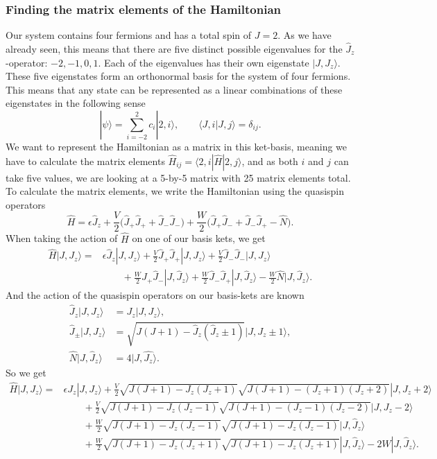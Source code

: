 \documentclass[a4paper, 11pt, notitlepage, english]{article}
\newcommand{\ket}[1]{|#1 \rangle}
\newcommand{\braket}[2]{\langle #1 | #2 \rangle}
\newcommand{\op}[1]{\hat{#1}}
\newcommand{\braopket}[3]{\langle #1 | {#2} | #3 \rangle}
\newcommand{\eps}{\epsilon}
\begin{document}
\subsubsection*{Finding the matrix elements of the Hamiltonian}
Our system contains four fermions and has a total spin of $J=2$. As we have already seen, this means that there are five distinct possible eigenvalues for the $\op{J}_z$-operator: $-2,-1,0,1$. Each of the eigenvalues has their own eigenstate $\ket{J, J_z}$. These five eigenstates form an orthonormal basis for the system of four fermions. This means that any state can be represented as a linear combinations of these eigenstates in the following sense
$$\ket{\psi} = \sum_{i=-2}^2 c_i\ket{2, i}, \qquad \braket{J, i}{J, j} = \delta_{ij}.$$
We want to represent the Hamiltonian as a matrix in this ket-basis, meaning we have to calculate the matrix elements $\op{H}_{ij} = \braopket{2, i}{\op{H}}{2, j}$, and as both $i$ and $j$ can take five values, we are looking at a 5-by-5 matrix with 25 matrix elements total. To calculate the matrix elements, we write the Hamiltonian using the quasispin operators
$$\op{H} = \eps\op{J}_z + \frac{V}{2}\big(\op{J}_+\op{J}_+ + \op{J}_-\op{J}_-\big) + \frac{W}{2}\big(\op{J}_+\op{J}_- + \op{J}_-\op{J}_+ - \op{N}\big).$$
When taking the action of $\op{H}$ on one of our basis kets, we get
\begin{align*}
\op{H}\ket{J, J_z} = &\eps\op{J}_z\ket{J, J_z} + \frac{V}{2}\op{J}_+\op{J}_+\ket{J, J_z} + \frac{V}{2}\op{J}_-\op{J}_-\ket{J, J_z} \\ &\qquad+ \frac{W}{2}\op{J}_+\op{J}_-\ket{J, \op{J}_z} + \frac{W}{2}\op{J}_-\op{J}_+\ket{J, \op{J}_z} - \frac{W}{2}\op{N}\ket{J, \op{J}_z}.
\end{align*}
And the action of the quasispin operators on our basis-kets are known
\begin{align*}
\op{J}_z \ket{J, J_z} &= J_z \ket{J, J_z}, \\
\op{J}_\pm \ket{J, J_z} &=  \sqrt{J(J+1) - \op{J}_z(\op{J}_z\pm1)}\ket{J, J_z\pm 1}, \\
\op{N}\ket{J, \op{J}_z} &= 4 \ket{J, \op{J_z}}.
\end{align*}
So we get
\begin{align*}
\op{H}\ket{J, J_z} = &\eps J_z\ket{J, J_z} + \frac{V}{2}\sqrt{J(J+1)-J_z(J_z+1)}\sqrt{J(J+1)-(J_z+1)(J_z+2)}\ket{J, J_z+2} \\&\qquad+ \frac{V}{2}\sqrt{J(J+1)-J_z(J_z-1)}\sqrt{J(J+1)-(J_z-1)(J_z-2)}\ket{J, J_z-2} \\ &\qquad+ \frac{W}{2}\sqrt{J(J+1)-J_z(J_z-1)}\sqrt{J(J+1)-J_z(J_z-1)}\ket{J, \op{J}_z} \\&\qquad+ \frac{W}{2}\sqrt{J(J+1)-J_z(J_z+1)}\sqrt{J(J+1)-J_z(J_z+1)}\ket{J, \op{J}_z} - 2W\ket{J, \op{J}_z}.
\end{align*}
\end{document}
